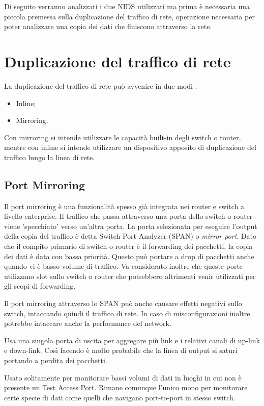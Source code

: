 Di seguito verranno analizzati i due NIDS utilizzati ma prima è necessaria una piccola premessa sulla duplicazione del traffico di rete, operazione necessaria per poter analizzare una copia dei dati che fluiscono attraverso la rete.
\section{Duplicazione del traffico di rete}
La duplicazione del traffico di rete può avvenire in due modi \cite{svoboda2015network}:
\begin{itemize}
    \item Inline;
    \item Mirroring.
\end{itemize}
Con mirroring si intende utilizzare le capacità built-in degli switch o router, mentre con inline si intende utilizzare un dispositivo apposito di duplicazione del traffico lungo la linea di rete.

\subsection{Port Mirroring}
Il port mirroring è una funzionalità spesso già integrata nei router e switch a livello enterprise. Il traffico che passa attraverso una porta dello switch o router viene 'specchiato' verso un'altra porta. La porta selezionata per eseguire l'output della copia del traffico è detta Switch Port Analyzer (SPAN) o \textit{mirror port}. Dato che il compito primario di switch o router è il forwarding dei pacchetti, la copia dei dati è data con bassa priorità. Questo può portare a drop di pacchetti anche quando vi è basso volume di traffico. 
Va considerato inoltre che queste porte utilizzano slot sullo switch o router che potrebbero altrimenti venir utilizzati per gli scopi di forwarding.

Il port mirroring attraverso lo SPAN può anche causare effetti negativi sullo switch, intaccando quindi il traffico di rete. In caso di misconfigurazioni inoltre potrebbe intaccare anche la performance del network.

Usa una singola porta di uscita per aggregare più link e i relativi canali di up-link e down-link. Così facendo è molto probabile che la linea di output si saturi portando a perdita dei pacchetti.

Usato solitamente per monitorare bassi volumi di dati in luoghi in cui non è presente un Test Access Port. 
Rimane comunque l'unico mono per monitorare certe specie di dati come quelli che navigano port-to-port in stesso switch.




